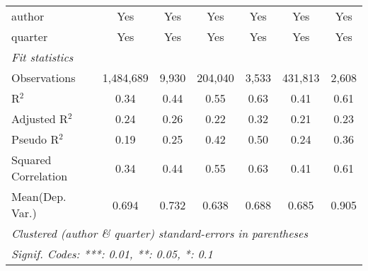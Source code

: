 \begin{tabular}{lcccccc}
   author                                                     & Yes            & Yes          & Yes           & Yes          & Yes            & Yes\\  
   quarter                                                    & Yes            & Yes          & Yes           & Yes          & Yes            & Yes\\  
   \midrule
   \emph{Fit statistics}\\
   Observations                                               & 1,484,689      & 9,930        & 204,040       & 3,533        & 431,813        & 2,608\\  
   R$^2$                                                      & 0.34           & 0.44         & 0.55          & 0.63         & 0.41           & 0.61\\  
   Adjusted R$^2$                                             & 0.24           & 0.26         & 0.22          & 0.32         & 0.21           & 0.23\\  
   Pseudo R$^2$                                               & 0.19           & 0.25         & 0.42          & 0.50         & 0.24           & 0.36\\  
   Squared Correlation                                        & 0.34           & 0.44         & 0.55          & 0.63         & 0.41           & 0.61\\  
Mean(Dep. Var.) & 0.694 & 0.732 & 0.638 & 0.688 & 0.685 & 0.905 \\
   \midrule \midrule
   \multicolumn{7}{l}{\emph{Clustered (author \& quarter) standard-errors in parentheses}}\\
   \multicolumn{7}{l}{\emph{Signif. Codes: ***: 0.01, **: 0.05, *: 0.1}}\\
\end{tabular}
\par\endgroup

